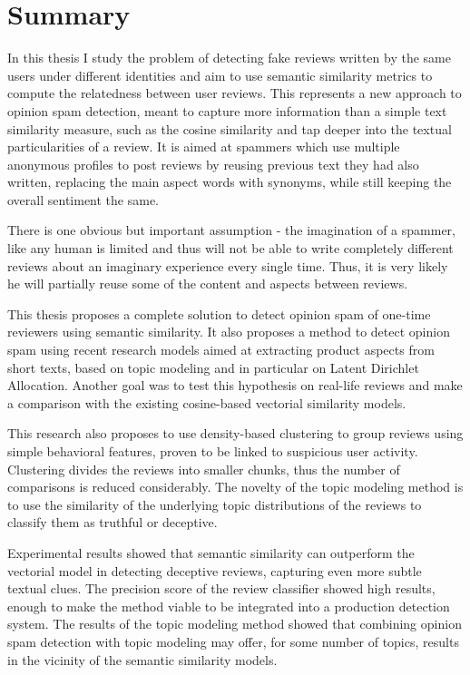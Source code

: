 \chapter{Summary}

In this thesis I study the problem of detecting fake reviews written by the same users under different identities and aim to use semantic similarity metrics to compute the relatedness between user reviews. This represents a new approach to opinion spam detection, meant to capture more information than a simple text similarity measure, such as the cosine similarity and tap deeper into the textual particularities of a review. It is aimed at spammers which use multiple anonymous profiles to post reviews by reusing previous text they had also written, replacing the main aspect words with synonyms, while still keeping the overall sentiment the same. 

There is one obvious but important assumption - the imagination of a spammer, like any human is limited and thus will not be able to write completely different reviews about an imaginary experience every single time. Thus, it is very likely he will partially reuse some of the content and aspects between reviews.

This thesis proposes a complete solution to detect opinion spam of one-time reviewers using semantic similarity. It also proposes a method to detect opinion spam using recent research models aimed at extracting product aspects from short texts, based on topic modeling and in particular on Latent Dirichlet Allocation. Another goal was to test this hypothesis on real-life reviews and make a comparison with the existing cosine-based vectorial similarity models.

This research also proposes to use density-based clustering to group reviews using simple behavioral features, proven to be linked to suspicious user activity. Clustering divides the reviews into smaller chunks, thus the number of comparisons is reduced considerably. The novelty of the topic modeling method is to use the similarity of the underlying topic distributions of the reviews to classify them as truthful or deceptive. 

Experimental results showed that semantic similarity can outperform the vectorial model in detecting deceptive reviews, capturing even more subtle textual clues. The precision score of the review classifier showed high results, enough to make the method viable to be integrated into a production detection system. The results of the topic modeling method showed that combining opinion spam detection with topic modeling may offer, for some number of topics, results in the vicinity of the semantic similarity models.